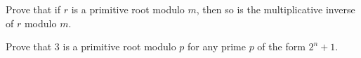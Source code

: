 \documentclass{subfile}
\begin{document}
	\begin{problem}
		Prove that if $r$ is a primitive root modulo $m$, then so is the multiplicative inverse of $r$ modulo $m$. %
	\end{problem}
	
	
	\begin{problem}
		Prove that $3$ is a primitive root modulo $p$ for any prime $p$ of the form $2^n+1$. %
	\end{problem}
	
\end{document}
